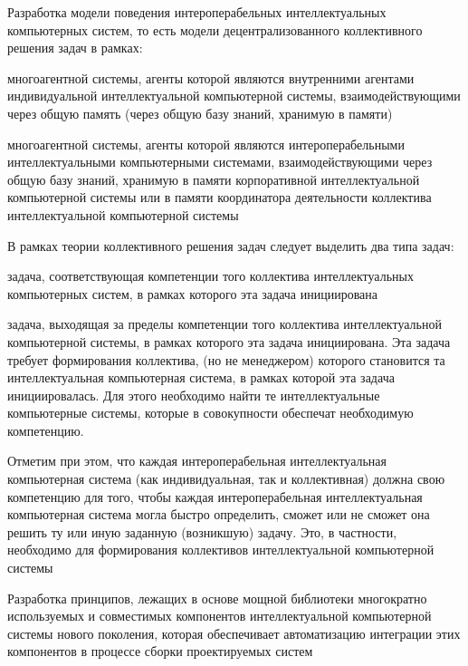 \begin{textitemize}
	\item Разработка модели  поведения интероперабельных интеллектуальных компьютерных систем, то есть модели децентрализованного коллективного решения задач в рамках:
	\begin{textitemize}
		\item многоагентной системы, агенты которой являются внутренними агентами индивидуальной интеллектуальной компьютерной системы, взаимодействующими через общую память (через общую базу знаний, хранимую в  памяти)
		\item многоагентной системы, агенты которой являются интероперабельными интеллектуальными компьютерными системами, взаимодействующими через общую базу знаний, хранимую в памяти корпоративной интеллектуальной компьютерной системы или в памяти координатора деятельности  коллектива интеллектуальной компьютерной системы 
	\end{textitemize}
	\vspace{-1\baselineskip}
	В рамках теории коллективного решения задач следует выделить два типа задач:
	\begin{textitemize}
		\item задача, соответствующая компетенции того коллектива интеллектуальных компьютерных систем, в рамках которого эта задача инициирована
		\item задача, выходящая за пределы компетенции того коллектива интеллектуальной компьютерной системы, в рамках которого эта задача инициирована. Эта задача требует формирования  коллектива,  (но не менеджером) которого становится та интеллектуальная компьютерная система, в рамках которой эта задача инициировалась. Для этого необходимо найти те интеллектуальные компьютерные системы, которые в совокупности обеспечат необходимую компетенцию.
	\end{textitemize}
	\vspace{-1\baselineskip}
	Отметим при этом, что каждая интероперабельная интеллектуальная компьютерная система (как индивидуальная, так и коллективная) должна  свою компетенцию для того, чтобы каждая интероперабельная интеллектуальная компьютерная система могла быстро определить, сможет или не сможет она решить ту или иную заданную (возникшую) задачу. Это, в частности, необходимо для формирования  коллективов интеллектуальной компьютерной системы
	\item Разработка принципов, лежащих в основе мощной библиотеки многократно используемых и совместимых компонентов интеллектуальной компьютерной системы нового поколения, которая обеспечивает  автоматизацию интеграции этих компонентов в процессе сборки проектируемых систем\\

\end{textitemize}
